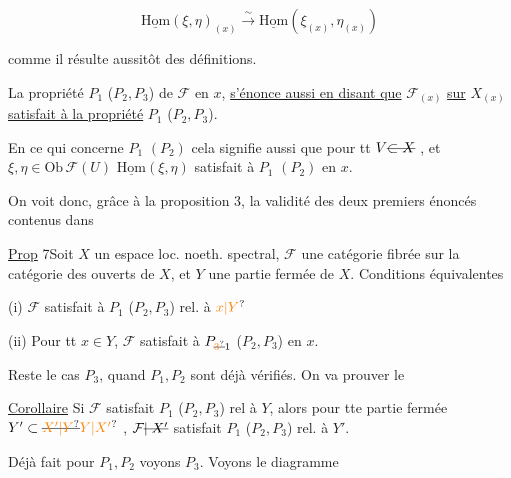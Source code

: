 \[
\underline{\mathrm{Hom}}(\xi,\eta)_{(x)}\xrightarrow{\sim}
\underline{\mathrm{Hom}}(\xi_{(x)},\eta_{(x)})
\]

comme il résulte aussitôt des définitions.


 La propriété $P_1$ ($P_2,P_3$) de $\mathcal F$ en $x$, \uline{s'énonce aussi en disant que} $\mathcal F_{(x)}$ \uline{sur} $X_{(x)}$ \uline{satisfait à la propriété} $P_1$ ($P_2,P_3$).

En ce qui concerne $P_1$ $(P_2)$ cela signifie aussi que pour tt   $V\deleted{\subset X}$ , et $\xi,\eta\in\mathrm{Ob}\,\mathcal F(U)$ $\underline{\mathrm{Hom}}(\xi,\eta)$ satisfait à $P_1$ $(P_2)$ en $x$.


On voit donc, grâce à la proposition 3, la validité des deux premiers énoncés contenus dans

\uline{Prop} 7\quad Soit $X$ un espace loc. noeth. spectral, $\mathcal F$ une catégorie fibrée sur la catégorie des ouverts de $X$, et  $Y$ une partie fermée de $X$.  Conditions équivalentes

(i) $\mathcal F$ satisfait à $P_1$ ($P_2,P_3$) rel. à $\unsure{x|Y}$

(ii) Pour tt $x\in Y$, $\mathcal F$ satisfait à $P_{\deleted{\unsure{3}}1}$ ($P_2,P_3$) en $x$.

Reste le cas $P_3$,  quand $P_1,P_2$ sont déjà vérifiés. On va prouver le



\uline{Corollaire} \quad Si $\mathcal F$ satisfait $P_1$ ($P_2,P_3$) rel à $Y$, alors pour  tte partie fermée $Y'\subset \deleted{\unsure{X'|Y}}\unsure{Y|X'}$ , $\mathcal F\deleted{\mid X'}$ satisfait $P_1$ ($P_2,P_3$) rel. à $Y'$.

Déjà fait pour $P_1,P_2$ voyons $P_3$. Voyons le diagramme

